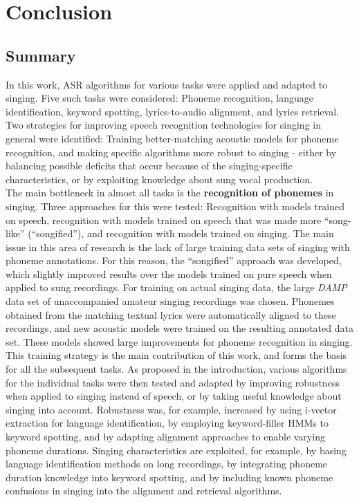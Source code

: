 \chapter{Conclusion} \label{chap:conclusion}
\section{Summary}
In this work, ASR algorithms for various tasks were applied and adapted to singing. Five such tasks were considered: Phoneme recognition, language identification, keyword spotting, lyrics-to-audio alignment, and lyrics retrieval.
Two strategies for improving speech recognition technologies for singing in general were identified: Training better-matching acoustic models for phoneme recognition, and making specific algorithms more robust to singing - either by balancing possible deficits that occur because of the singing-specific characteristics, or by exploiting knowledge about sung vocal production.\\

The main bottleneck in almost all tasks is the \textbf{recognition of phonemes} in singing. Three approaches for this were tested: Recognition with models trained on speech, recognition with models trained on speech that was made more ``song-like'' (``songified''), and recognition with models trained on singing. The main issue in this area of research is the lack of large training data sets of singing with phoneme annotations. For this reason, the ``songified'' approach was developed, which slightly improved results over the models trained on pure speech when applied to sung recordings. For training on actual singing data, the large \textit{DAMP} data set of unaccompanied amateur singing recordings was chosen. Phonemes obtained from the matching textual lyrics were automatically aligned to these recordings, and new acoustic models were trained on the resulting annotated data set. These models showed large improvements for phoneme recognition in singing.\\

This training strategy is the main contribution of this work, and forms the basis for all the subsequent tasks. As proposed in the introduction, various algorithms for the individual tasks were then tested and adapted by improving robustness when applied to singing instead of speech, or by taking useful knowledge about singing into account. Robustness was, for example, increased by using i-vector extraction for language identification, by employing keyword-filler HMMs to keyword spotting, and by adapting alignment approaches to enable varying phoneme durations. Singing characteristics are exploited, for example, by basing language identification methods on long recordings, by integrating phoneme duration knowledge into keyword spotting, and by including known phoneme confusions in singing into the alignment and retrieval algorithms.\\

